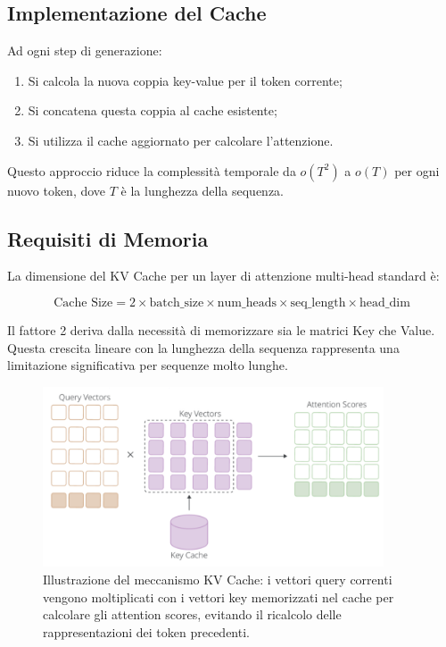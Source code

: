 \subsection{Implementazione del Cache}
Ad ogni step di generazione:
\begin{enumerate}
\item Si calcola la nuova coppia key-value per il token corrente;
\item Si concatena questa coppia al cache esistente;
\item Si utilizza il cache aggiornato per calcolare l'attenzione.
\end{enumerate}

Questo approccio riduce la complessità temporale da $o(T^2)$ a $o(T)$ per ogni nuovo token, dove $T$ è la lunghezza della sequenza.

\subsection{Requisiti di Memoria}
La dimensione del KV Cache per un layer di attenzione multi-head standard è:

\begin{equation}
\text{Cache Size} = 2 \times \text{batch\_size} \times \text{num\_heads} \times \text{seq\_length} \times \text{head\_dim}
\end{equation}

Il fattore 2 deriva dalla necessità di memorizzare sia le matrici Key che Value. Questa crescita lineare con la lunghezza della sequenza rappresenta una limitazione significativa per sequenze molto lunghe.

\begin{figure}
    \centering
    \includegraphics[width=0.9\textwidth]{figure/KVCache}
    \caption{Illustrazione del meccanismo KV Cache: i vettori query correnti vengono moltiplicati con i vettori key memorizzati nel cache per calcolare gli attention scores, evitando il ricalcolo delle rappresentazioni dei token precedenti.}
    \label{fig:KVC}
\end{figure}
